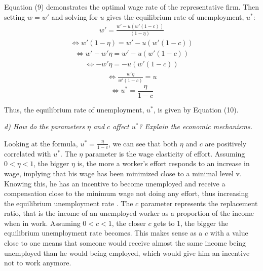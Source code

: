 \documentclass[11pt]{article} %
\begin{document}
Equation (9) demonstrates the optimal wage rate of the representative firm. Then setting $w=w'$ and solving for $u$ gives the equilibrium rate of unemployment, $u^*$:
\begin{align*}
    w' = \frac{w' - u\left(w' (1 - c)\right)} {(1 - \eta)}
\end{align*}
\begin{align*}
   \Longleftrightarrow w'(1 - \eta) = {w' - u\left(w' (1 - c)\right)} 
\end{align*}
\begin{align*}
   \Longleftrightarrow w' - w'\eta = {w' - u\left(w' (1 - c)\right)} 
\end{align*}
\begin{align*}
   \Longleftrightarrow - w'\eta = {- u\left(w' (1 - c)\right)}
\end{align*}
\begin{align*}
   \Longleftrightarrow \frac{w' \eta}{w'(1-c)} = u 
\end{align*}
\begin{equation}
    \Longleftrightarrow u^* = \frac{\eta}{1-c}
\end{equation}

\bigskip
Thus, the equilibrium rate of unemployment, $u^*$, is given by Equation (10).






\pagebreak
\textit{d) How do the parameters $\eta$ and $c$ affect $u^*$? Explain the economic mechanisms.}

\bigskip
Looking at the formula, $u^* = \frac {\eta} {1 -c}$, we can see that both $\eta$ and $c$ are positively correlated with $u^*$. The $\eta$ parameter is the wage elasticity of effort. Assuming $0 < \eta < 1$, the bigger $\eta$ is, the more a worker's effort responds to an increase in wage, implying that his wage has been minimized close to a minimal level v. Knowing this, he has an incentive to become unemployed and receive a compensation close to the minimum wage not doing any effort, thus increasing the equilibrium unemployment rate . The $c$ parameter represents the replacement ratio, that is the income of an unemployed worker as a proportion of the income when in work. Assuming $0 < c < 1$, the closer $c$ gets to 1, the bigger the equilibrium unemployment rate becomes. This makes sense as a $c$ with a value close to one means that someone would receive almost the same income being unemployed than he would being employed, which would give him an incentive not to work anymore.
\end{document}
